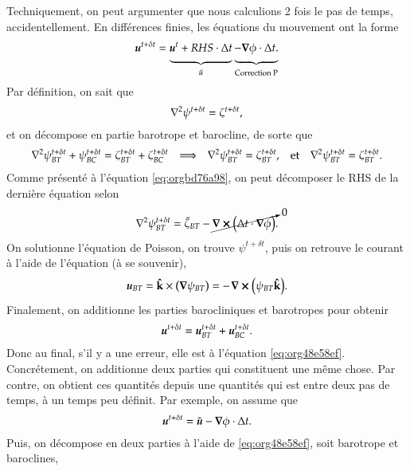 \documentclass[10pt]{article}
\numberwithin{equation}{section}
\newcommand{\kvf}{\vb{\hat{k}}}
\newcommand{\uu}{\vb*{u}}
\newcommand{\pt}{\hspace{1pt}}
\newcommand{\tall}{\vphantom{A^{x^x}_p}}
\begin{document}
Techniquement, on peut argumenter que nous calculions 2 fois le pas de temps, accidentellement.
En différences finies, les équations du mouvement ont la forme
\begin{equation}
\label{eq:orgbd76a98}
   \uu^{t+\delta t} =
   \underbrace{\uu^t + RHS\cdot \Delta t\tall}_{\tilde{u}}
   \underbrace{- \gradient{\phi}\cdot \Delta t.\tall}_\text{Correction P}
\end{equation}
Par définition, on sait que
\begin{equation}
   \laplacian{\psi^{t+\delta t}} = \zeta^{t+\delta t},
\end{equation}
et on décompose en partie barotrope et barocline, de sorte que
\begin{align}
   && \laplacian{\psi^{t+\delta t}_{BT} + \psi^{t+\delta t}_{BC}} = \zeta^{t+\delta t}_{BT} + \zeta^{t+\delta t}_{BC}
   && \Longrightarrow
   && \laplacian{\psi^{t+\delta t}}_{BT} = \zeta^{t+\delta t}_{BT},
   && \text{et}
   && \laplacian{\psi^{t+\delta t}}_{BT} = \zeta^{t+\delta t}_{BT}.&&
\end{align}
Comme présenté à l'équation \ref{eq:orgbd76a98}, on peut décomposer le RHS de la dernière équation selon
\begin{align}
   \laplacian{\psi^{t+\delta t}}_{BT} = \tilde{\zeta}_{BT} - \cancelto{0}{\curl(\Delta t\cdot\gradient{\phi})}.
\end{align}
On solutionne l'équation de Poisson, on trouve \(\psi^{t+\delta t}\), puis on retrouve le courant à l'aide de l'équation (à se souvenir), 
\begin{equation}
   \uu_{BT} = \kvf \times \qty(\gradient{\psi_{BT}}) = - \pt\curl(\psi_{BT}\kvf).
\end{equation}
Finalement, on additionne les parties barocliniques et barotropes pour obtenir
\begin{equation}
\label{eq:org48e58ef}
   \uu^{t+\delta t} = \uu_{BT}^{t+\delta t} + \uu_{BC}^{t+\delta t}.
\end{equation}
Donc au final, s'il y a une erreur, elle est à l'équation \ref{eq:org48e58ef}.
Concrétement, on additionne deux parties qui constituent une même chose.
Par contre, on obtient ces quantités depuis une quantités qui est entre deux pas de temps, à un temps peu définit.
Par exemple, on assume que
\begin{equation}
   \uu^{t+\delta t} = \tilde{\uu} - \gradient{\phi} \cdot \Delta t.
\end{equation}
Puis, on décompose en deux parties à l'aide de \ref{eq:org48e58ef}, soit barotrope et baroclines,
\end{document}
